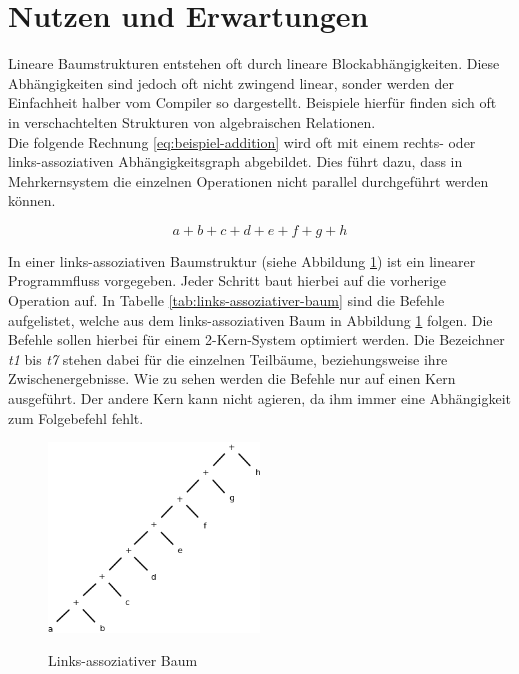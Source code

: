 \section{Nutzen und Erwartungen}
\label{Nutzen}

Lineare Baumstrukturen entstehen oft durch lineare Blockabhängigkeiten. Diese Abhängigkeiten sind jedoch oft nicht zwingend linear, sonder werden der Einfachheit halber vom Compiler so dargestellt. Beispiele hierfür finden sich oft in verschachtelten Strukturen von algebraischen Relationen. \\
Die folgende Rechnung \ref{eq:beispiel-addition} wird oft mit einem rechts- oder links-assoziativen Abhängigkeitsgraph abgebildet. Dies führt dazu, dass in Mehrkernsystem die einzelnen Operationen nicht parallel durchgeführt werden können.

\begin{equation} \label{eq:beispiel-addition}
a + b + c + d + e + f + g + h
\end{equation}

In einer links-assoziativen Baumstruktur (siehe Abbildung \ref{fig:links-assoziativer-baum}) ist ein linearer Programmfluss vorgegeben. Jeder Schritt baut hierbei auf die vorherige Operation auf. In Tabelle \ref{tab:links-assoziativer-baum} sind die Befehle aufgelistet, welche aus dem links-assoziativen Baum in Abbildung \ref{fig:links-assoziativer-baum} folgen. Die Befehle sollen hierbei für einem 2-Kern-System optimiert werden. Die Bezeichner \textit{t1} bis \textit{t7} stehen dabei für die einzelnen Teilbäume, beziehungsweise ihre Zwischenergebnisse. Wie zu sehen werden die Befehle nur auf einen Kern ausgeführt. Der andere Kern kann nicht agieren, da ihm immer eine Abhängigkeit zum Folgebefehl fehlt.\\

\begin{figure}
	\begin{center}
		\includegraphics[width=0.5\textwidth]{images/links_assoziativer_baum}\\
	\end{center}
	\caption{Links-assoziativer Baum}
	\label{fig:links-assoziativer-baum}
\end{figure}

